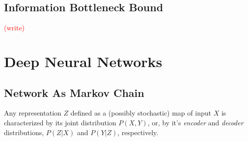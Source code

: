 \documentclass[11pt]{article}
\newcommand\myworries[1]{\textcolor{red}{(#1)}}
\begin{document}
\subsection*{Information Bottleneck Bound}

\myworries{write}

\section{Deep Neural Networks}

\subsection*{Network As Markov Chain}

Any representation $Z$ defined as a (possibly stochastic) map of input $X$ is characterized by its joint distribution $P(X,Y)$, or, by it's \emph{encoder} and \emph{decoder} distributions, $P(Z \vert X)$ and $P(Y \vert Z)$, respectively.
\end{document}
